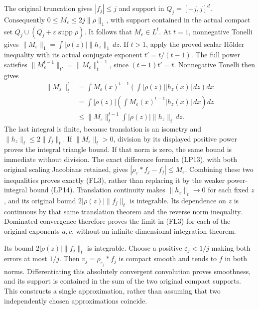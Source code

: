 \documentclass[
  11pt,
]{article}
\begin{document}
The original truncation gives \(|f_j|\leq j\) and support in
\(Q_j=[-j,j]^d\). Consequently \(0\leq M_\varepsilon\leq2j\|\rho\|_1\),
with support contained in the actual compact set
\(Q_j\cup(Q_j+\varepsilon\operatorname{supp}\rho)\). It follows that
\(M_\varepsilon\in L^t\). At \(t=1\), nonnegative Tonelli gives
\(\|M_\varepsilon\|_1=\int|\rho(z)|\|h_z\|_1\,dz\). If \(t>1\), apply
the proved scalar Hölder inequality with its actual conjugate exponent
\(t'=t/(t-1)\). The full power satisfies
\(\|M_\varepsilon^{t-1}\|_{t'}=\|M_\varepsilon\|_t^{t-1}\), since
\((t-1)t'=t\). Nonnegative Tonelli then gives \[
 \begin{aligned}
 \|M_\varepsilon\|_t^t
 &=\int M_\varepsilon(x)^{t-1}
              \left(\int|\rho(z)||h_z(x)|\,dz\right)dx\\
 &=\int|\rho(z)|
              \left(\int M_\varepsilon(x)^{t-1}|h_z(x)|\,dx\right)dz\\
 &\leq\|M_\varepsilon\|_t^{t-1}
                 \int|\rho(z)|\|h_z\|_t\,dz.
 \end{aligned}\tag{FL3a}
\] The last integral is finite, because translation is an isometry and
\(\|h_z\|_t\leq2\|f_j\|_t\). If \(\|M_\varepsilon\|_t>0\), division by
its displayed positive power proves the integral triangle bound. If that
norm is zero, the same bound is immediate without division. The exact
difference formula (LP13), with both original scaling Jacobians
retained, gives \(|\rho_\varepsilon*f_j-f_j|\leq M_\varepsilon\).
Combining these two inequalities proves exactly (FL3), rather than
replacing it by the weaker power-integral bound (LP14). Translation
continuity makes \(\|h_z\|_t\to0\) for each fixed \(z\), and its
original bound \(2|\rho(z)|\|f_j\|_t\) is integrable. Its dependence on
\(z\) is continuous by that same translation theorem and the reverse
norm inequality. Dominated convergence therefore proves the limit in
(FL3) for each of the original exponents \(a,c\), without an
infinite-dimensional integration theorem.

Its bound \(2|\rho(z)|\|f_j\|_t\) is integrable. Choose a positive
\(\varepsilon_j<1/j\) making both errors at most \(1/j\). Then
\(v_j=\rho_{\varepsilon_j}*f_j\) is compact smooth and tends to \(f\) in
both norms. Differentiating this absolutely convergent convolution
proves smoothness, and its support is contained in the sum of the two
original compact supports. This constructs a single approximation,
rather than assuming that two independently chosen approximations
coincide.
\end{document}

